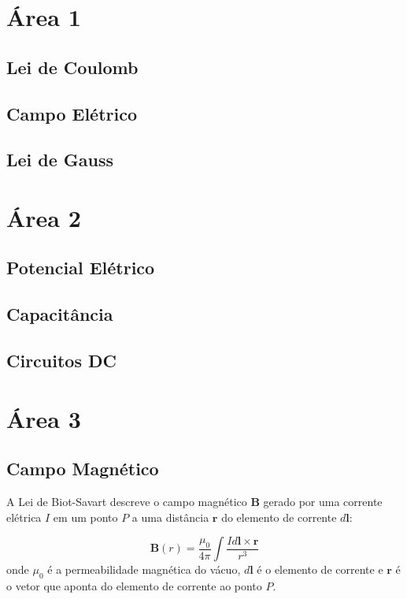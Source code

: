 \documentclass{article}
\begin{document}
\tableofcontents

\section{Área 1}

\subsection{Lei de Coulomb}
\subsection{Campo Elétrico}
\subsection{Lei de Gauss}

\section{Área 2}

\subsection{Potencial Elétrico}
\subsection{Capacitância}
\subsection{Circuitos DC}


\section{Área 3}

\subsection{Campo Magnético}

A Lei de Biot-Savart descreve o campo magnético \(\mathbf{B}\) gerado por uma corrente elétrica \(I\) em um ponto \(P\) a uma distância \(\mathbf{r}\) do elemento de corrente \(d\mathbf{l}\):

\begin{equation}\label{eq:lei_biot_savart}
    \boxed{\mathbf{B}(r) = \frac{\mu_0}{4\pi} \int \frac{I d\mathbf{l} \times \mathbf{r}}{r^3}}
\end{equation} onde \(\mu_0\) é a permeabilidade magnética do vácuo, \(d\mathbf{l}\) é o elemento de corrente e \(\mathbf{r}\) é o vetor que aponta do elemento de corrente ao ponto \(P\).
\end{document}
